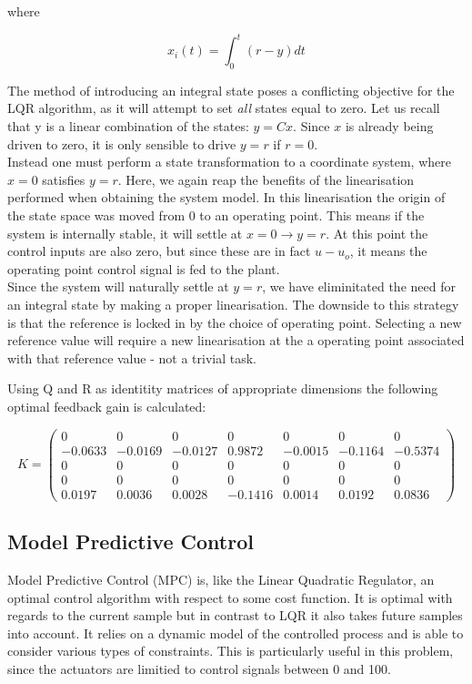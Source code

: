 where

\begin{equation}
	x_i(t) = \int_{0}^{t}(r-y)dt
\end{equation}

The method of introducing an integral state poses a conflicting objective for the LQR algorithm, as it will attempt to set \textit{all} states equal to zero. Let us recall that y is a linear combination of the states: $y = Cx$. Since $x$ is already being driven to zero, it is only sensible to drive $y=r$ if $r=0$.\\


Instead one must perform a state transformation to a coordinate system, where $x=0$ satisfies $y=r$. Here, we again reap the benefits of the linearisation performed when obtaining the system model. In this linearisation the origin of the state space was moved from 0 to an operating point. This means if the system is internally stable, it will settle at $x=0 \rightarrow y=r$. At this point the control inputs are also zero, but since these are in fact $u-u_o$, it means the operating point control signal is fed to the plant. \\

Since the system will naturally settle at $y=r$, we have eliminitated the need for an integral state by making a proper linearisation. The downside to this strategy is that the reference is locked in by the choice of operating point. Selecting a new reference value will require a new linearisation at the a operating point associated with that reference value - not a trivial task.

Using Q and R as identitity matrices of appropriate dimensions the following optimal feedback gain is calculated:

\begin{equation}
	K = \left(\begin{array}{ccccccc}
		0 & 0 & 0 & 0 & 0 & 0 & 0\\
		-0.0633 & -0.0169 & -0.0127 & 0.9872 & -0.0015 & -0.1164 & -0.5374\\
		0 & 0 & 0 & 0 & 0 & 0 & 0\\
		0 & 0 & 0 & 0 & 0 & 0 & 0\\
		0.0197 & 0.0036 & 0.0028 & -0.1416 & 0.0014 & 0.0192 & 0.0836
	\end{array}\right)
\end{equation}

\subsection{Model Predictive Control}
Model Predictive Control (MPC) is, like the Linear Quadratic Regulator, an optimal control algorithm with respect to some cost function. It is optimal with regards to the current sample but in contrast to LQR it also takes future samples into account. It relies on a dynamic model of the controlled process and is able to consider various types of constraints. This is particularly useful in this problem, since the actuators are limitied to control signals between 0 and 100.\\

